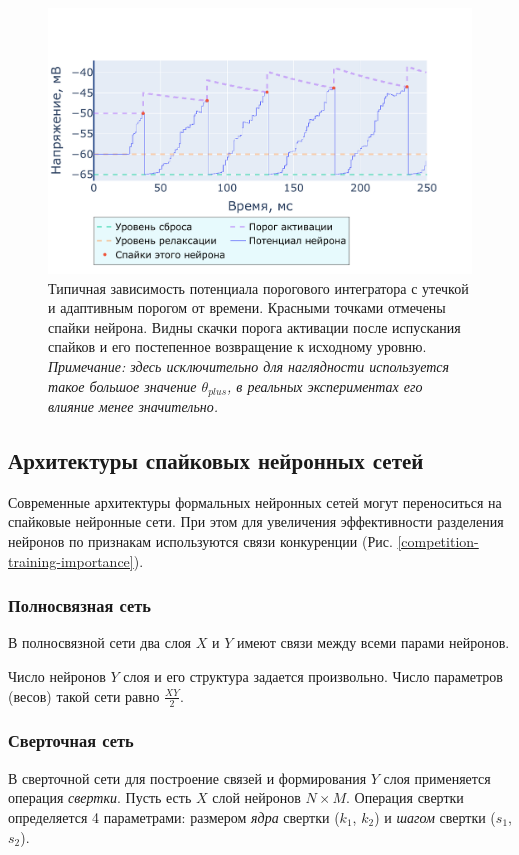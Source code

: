 \documentclass[a4paper]{article}
\begin{document}
\begin{center}
\begin{figure}[H]
 \includegraphics[width=\textwidth,keepaspectratio=true]{model_alif_ru.pdf}
 \caption{Типичная зависимость потенциала порогового интегратора с утечкой и адаптивным порогом от времени. Красными точками отмечены спайки нейрона. Видны скачки порога активации после испускания спайков и его постепенное возвращение к исходному уровню.\\
 \textit{Примечание: здесь исключительно для наглядности используется такое большое значение $\theta_{plus}$, в реальных экспериментах его влияние менее значительно.}}
\end{figure} 
\end{center}

\subsection{Архитектуры спайковых нейронных сетей}
Современные архитектуры формальных нейронных сетей могут переноситься на спайковые нейронные сети. При этом для увеличения эффективности разделения нейронов по признакам используются связи конкуренции (Рис. \ref{competition-training-importance}). 

\subsubsection{Полносвязная сеть}
В полносвязной сети два слоя $X$ и $Y$ имеют связи между всеми парами нейронов.

Число нейронов $Y$ слоя и его структура задается произвольно. Число параметров (весов) такой сети равно $\frac{XY}{2}$.

\subsubsection{Сверточная сеть}
В сверточной сети для построение связей и формирования $Y$ слоя применяется операция \textit{свертки}. Пусть есть $X$ слой нейронов $N \times M$. Операция свертки определяется 4 параметрами: размером \textit{ядра} свертки ($k_1$, $k_2$) и \textit{шагом} свертки ($s_1$, $s_2$).
\end{document}
